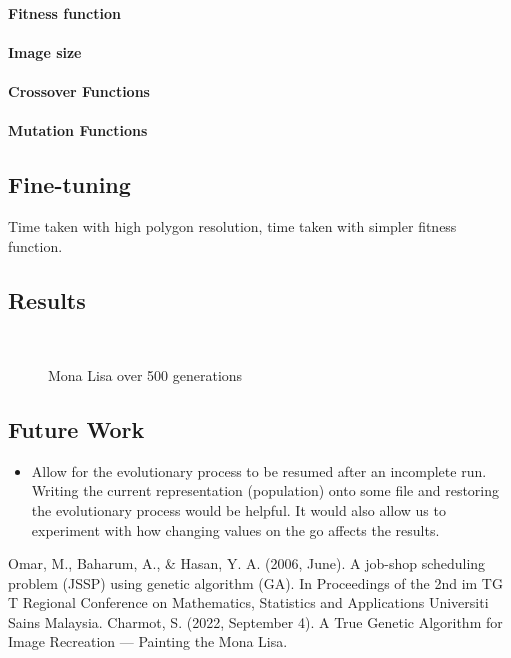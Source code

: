 \documentclass[11pt]{article}
\begin{document}
\paragraph{Fitness function}
\paragraph{Image size}
\paragraph{Crossover Functions}
\paragraph{Mutation Functions}

\subsection{Fine-tuning}
Time taken with high polygon resolution, time taken with simpler fitness function.
\subsection{Results}
\begin{figure}[h]
 \centering
   \hfill
   \hfill
   \hfill
   \hfill
   \hfill
   \
  \caption{Mona Lisa over 500 generations}
\end{figure}
\subsection{Future Work}
\begin{itemize}
    \item Allow for the evolutionary process to be resumed after an incomplete run. Writing the current representation (population) onto some file and restoring the evolutionary process would be helpful. It would also allow us to experiment with how changing values on the go affects the results.
\end{itemize}

\begin{thebibliography}{00}
 Omar, M., Baharum, A., \& Hasan, Y. A. (2006, June). A job-shop scheduling problem (JSSP) using genetic algorithm (GA). In Proceedings of the 2nd im TG T Regional Conference on Mathematics, Statistics and Applications Universiti Sains Malaysia.
\bibitem{medium} Charmot, S. (2022, September 4). A True Genetic Algorithm for Image Recreation — Painting the Mona Lisa.
\end{thebibliography}
\end{document}
